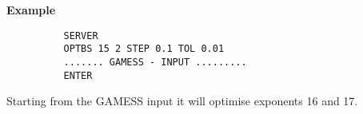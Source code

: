 \documentclass[11pt,fleqn]{article}
\begin{document}
{\bf Example}
{
\footnotesize
\begin{verbatim}
          SERVER
          OPTBS 15 2 STEP 0.1 TOL 0.01
          ....... GAMESS - INPUT .........
          ENTER
\end{verbatim}
}

Starting from the GAMESS input it will optimise exponents 16 and 17.
\end{document}
